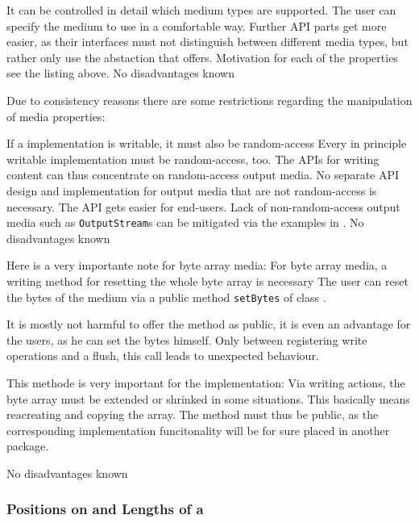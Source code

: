 {%
It can be controlled in detail which medium types are supported. The user can specify the medium to use in a comfortable way. Further API parts get more easier, as their interfaces must not distinguish between different media types, but rather only use the abstaction that \IMedium{} offers. Motivation for each of the properties see the listing above.
}
{%
No disadvantages known
}

Due to consistency reasons there are some restrictions regarding the manipulation of media properties:

{%
If a \IMedium{} implementation is writable, it must also be random-access
}
{%
Every in principle writable \IMedium{} implementation must be random-access, too. 
}
{%
The \LibName{} APIs for writing content can thus concentrate on random-access output media. No separate API design and implementation for output media that are not random-access is necessary. The API gets easier for end-users. Lack of non-random-access output media such as \texttt{OutputStream}s can be mitigated via the examples in .
}
{%
No disadvantages known
}

Here is a very importante note for byte array media:
{%
For byte array media, a writing method for resetting the whole byte array is necessary
}
{%
The user can reset the bytes of the medium via a public method \texttt{setBytes} of class \InMemoryMedium{}.
}
{%
It is mostly not harmful to offer the method as public, it is even an advantage for the users, as he can set the bytes himself. Only between registering write operations and a flush, this call leads to unexpected behaviour.

This methode is very important for the implementation: Via writing actions, the byte array must be extended or shrinked in some situations. This basically means reacreating and copying the array. The method must thus be public, as the corresponding implementation funcitonality will be for sure placed in another package.
}
{%
No disadvantages known
}


\subsubsection{Positions on and Lengths of a \TERMmedium{}}
\label{sec:PositiZugriffEinesTERMmedium}

